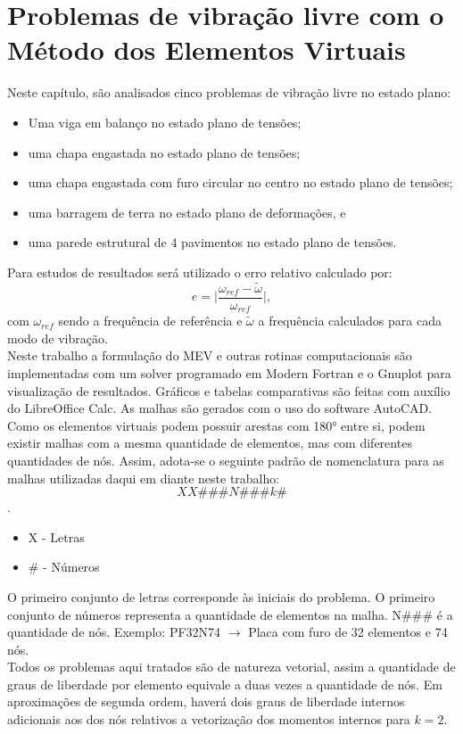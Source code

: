 \chapter{Problemas de vibração livre com o Método dos Elementos Virtuais}

\indent Neste capítulo, são analisados cinco problemas de vibração livre no estado plano:

    \begin{itemize}
        \item Uma viga em balanço no estado plano de tensões;
        \item uma chapa engastada no estado plano de tensões;
        \item uma chapa engastada com furo circular no centro no estado plano de tensões;
        \item uma barragem de terra no estado plano de deformações, e
        \item uma parede estrutural de 4 pavimentos no estado plano de tensões. 
    \end{itemize}

\indent Para estudos de resultados será utilizado o erro relativo calculado por:
\begin{equation}
    e = \big| \frac{\omega_{ref} - \tilde{\omega}}{\omega_{ref}} \big|,
\end{equation}
com $\omega_{ref}$ sendo a frequência de referência e $\tilde{\omega}$ a frequência calculados para cada modo de vibração.\\
\indent Neste trabalho a formulação do MEV e outras rotinas computacionais são implementadas com um solver programado em Modern Fortran
e o Gnuplot para visualização de resultados. Gráficos e tabelas comparativas são feitas com auxílio do LibreOffice Calc. As malhas são gerados com o uso do software AutoCAD.\\
\indent Como os elementos virtuais podem possuir arestas com 180° entre si, podem existir malhas com a mesma quantidade de elementos, mas com diferentes quantidades de nós. Assim, adota-se o seguinte padrão de nomenclatura para as malhas utilizadas daqui em diante neste trabalho: $$XX\#\#\#N\#\#\#k\#$$. 

    \begin{itemize}
        \item X - Letras
        \item \# - Números
    \end{itemize}
    
\indent O primeiro conjunto de letras corresponde às iniciais do problema. O primeiro conjunto de números representa a quantidade de elementos na malha. N\#\#\# é a quantidade de nós. Exemplo: PF32N74 $\rightarrow$ Placa com furo de 32 elementos e 74 nós. \\
\indent Todos os problemas aqui tratados são de natureza vetorial, assim a quantidade de graus de liberdade por elemento equivale a duas vezes a quantidade de nós. Em aproximações de segunda ordem, haverá dois graus de liberdade internos adicionais aos dos nós relativos a vetorização dos momentos internos para $k=2$. 

